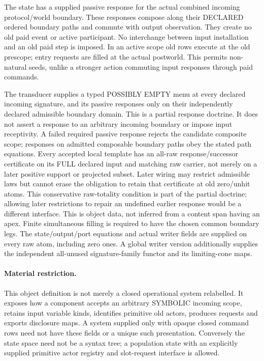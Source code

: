 \documentclass[11pt]{article}\usepackage{amsmath,amssymb,amsthm,geometry}\geometry{margin=1in}
\begin{document}
The state has a supplied passive response for the actual combined incoming protocol/world boundary. These responses compose along their DECLARED ordered boundary paths and commute with output observation. They create no old paid event or active participant. No interchange between input installation and an old paid step is imposed. In an active scope old rows execute at the old prescope; entry requests are filled at the actual postworld. This permits non-natural seeds, unlike a stronger action commuting input responses through paid commands.

The transducer supplies a typed POSSIBLY EMPTY menu at every declared incoming signature, and its passive responses only on their independently declared admissible boundary domain. This is a partial response doctrine. It does not assert a response to an arbitrary incoming boundary or impose input receptivity. A failed required passive response rejects the candidate composite scope; responses on admitted composable boundary paths obey the stated path equations. Every accepted local template has an all-raw response/successor certificate on its FULL declared input and matching raw carrier, not merely on a later positive support or projected subset. Later wiring may restrict admissible laws but cannot erase the obligation to retain that certificate at old zero/unhit atoms. This conservative raw-totality condition is part of the partial doctrine; allowing later restrictions to repair an undefined earlier response would be a different interface. This is object data, not inferred from a content span having an apex. Finite simultaneous filling is required to have the chosen common boundary legs. The state/output/port equations and actual writer fields are supplied on every raw atom, including zero ones. A global writer version additionally supplies the independent all-unused signature-family functor and its limiting-cone maps.

\paragraph{Material restriction.} This object definition is not merely a closed operational system relabelled. It exposes how a component accepts an arbitrary SYMBOLIC incoming scope, retains input variable kinds, identifies primitive old actors, produces requests and exports disclosure maps. A system supplied only with opaque closed command rows need not have these fields or a unique such presentation. Conversely the state space need not be a syntax tree; a population state with an explicitly supplied primitive actor registry and slot-request interface is allowed.
\end{document}
